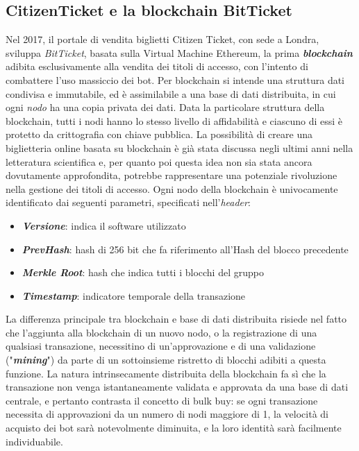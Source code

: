 \subsection{CitizenTicket e la blockchain BitTicket} \label{block}
Nel 2017, il portale di vendita biglietti Citizen Ticket, con sede a Londra, sviluppa \emph{BitTicket}, basata sulla Virtual Machine Ethereum, la prima \textbf{\textit{blockchain}} adibita esclusivamente alla vendita dei titoli di accesso, con l'intento di combattere l'uso massiccio dei bot. 
Per blockchain si intende una struttura dati condivisa e immutabile, ed è assimilabile a una base di dati distribuita, in cui ogni \textit{nodo} ha una copia privata dei dati. Data la particolare struttura della blockchain, tutti i nodi hanno lo stesso livello di affidabilità e ciascuno di essi è protetto da crittografia con chiave pubblica. 
La possibilità di creare una biglietteria online basata su blockchain è già stata discussa negli ultimi anni nella letteratura scientifica \cite{tackmann2017secure} e, per quanto poi questa idea non sia stata ancora dovutamente approfondita, potrebbe rappresentare una potenziale rivoluzione nella gestione dei titoli di accesso. 
Ogni nodo della blockchain è univocamente identificato dai seguenti parametri, specificati nell'\textit{header}: 
\begin{itemize}
\item \textbf{\textit{Versione}}: indica il software utilizzato
\item \textbf{\textit{PrevHash}}: hash di 256 bit che fa riferimento all'Hash del blocco precedente
\item \textbf{\textit{Merkle Root}}: hash che indica tutti i blocchi del gruppo
\item \textbf{\textit{Timestamp}}: indicatore temporale della transazione
\end{itemize}
La differenza principale tra blockchain e base di dati distribuita risiede nel fatto che l'aggiunta alla blockchain di un nuovo nodo, o la registrazione di una qualsiasi transazione, necessitino di un'approvazione e di una validazione ("\textbf{\textit{mining}}") da parte di un sottoinsieme ristretto di blocchi adibiti a questa funzione.  
La natura intrinsecamente distribuita della blockchain fa sì che la transazione non venga istantaneamente validata e approvata da una base di dati centrale, e pertanto contrasta il concetto di bulk buy: se ogni transazione necessita di approvazioni da un numero di nodi maggiore di 1, la velocità di acquisto dei bot sarà notevolmente diminuita, e la loro identità sarà facilmente individuabile.
